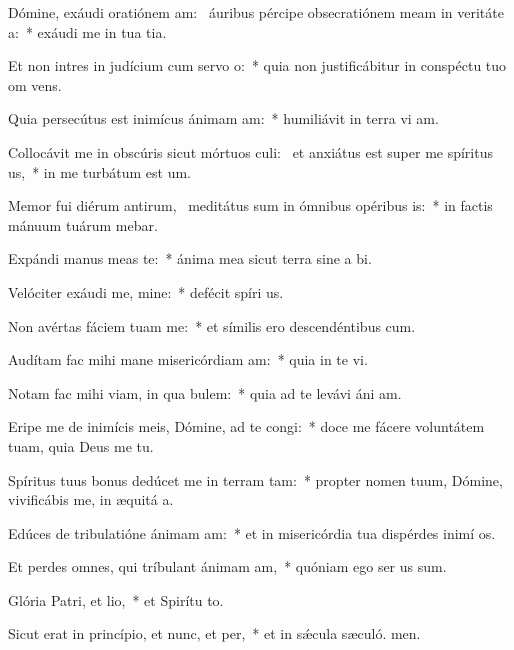 \item Dómine, exáudi oratiónem am:~\pscross{} áuribus pércipe obsecratiónem meam in veritáte a:~* exáudi me in tua tia.
\item Et non intres in judícium cum servo o:~* quia non justificábitur in conspéctu tuo om vens.
\item Quia persecútus est inimícus ánimam am:~* humiliávit in terra vi am.
\item Collocávit me in obscúris sicut mórtuos culi:~\pscross{} et anxiátus est super me spíritus us,~* in me turbátum est  um.
\item Memor fui diérum antirum,~\pscross{} meditátus sum in ómnibus opéribus is:~* in factis mánuum tuárum mebar.
\item Expándi manus meas  te:~* ánima mea sicut terra sine a bi.
\item Velóciter exáudi me, mine:~* defécit spíri us.
\item Non avértas fáciem tuam  me:~* et símilis ero descendéntibus  cum.
\item Audítam fac mihi mane misericórdiam am:~* quia in te vi.
\item Notam fac mihi viam, in qua bulem:~* quia ad te levávi áni am.
\item Eripe me de inimícis meis, Dómine, ad te congi:~* doce me fácere voluntátem tuam, quia Deus me  tu.
\item Spíritus tuus bonus dedúcet me in terram tam:~* propter nomen tuum, Dómine, vivificábis me, in æquitá a.
\item Edúces de tribulatióne ánimam am:~* et in misericórdia tua dispérdes inimí os.
\item Et perdes omnes, qui tríbulant ánimam am,~* quóniam ego ser us sum.
\item Glória Patri, et lio,~* et Spirítu to.
\item Sicut erat in princípio, et nunc, et per,~* et in sǽcula sæculó. men.
